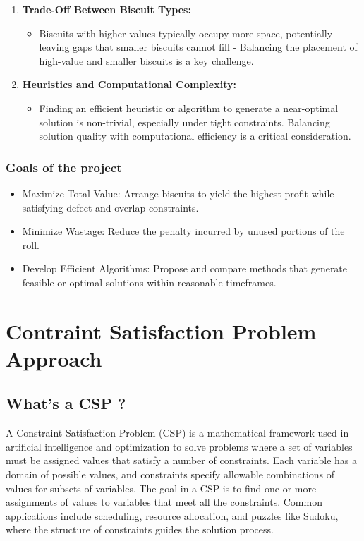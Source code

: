 \documentclass{modeleRapport}
\begin{document}
\begin{enumerate}
    \item \textbf{Trade-Off Between Biscuit Types:}
    \begin{itemize}
        \item Biscuits with higher values typically occupy more space, potentially leaving gaps that smaller biscuits 
        cannot fill - Balancing the placement of high-value and smaller biscuits is a key challenge.
    \end{itemize}

    \item \textbf{Heuristics and Computational Complexity:}
    \begin{itemize}
        \item Finding an efficient heuristic or algorithm to generate a near-optimal solution is non-trivial, 
        especially under tight constraints. Balancing solution quality with computational efficiency is a critical 
        consideration.
    \end{itemize}
\end{enumerate}

\subsubsection{Goals of the project}

\begin{itemize}
    \item Maximize Total Value: Arrange biscuits to yield the highest profit while satisfying defect and overlap constraints.
    \item Minimize Wastage: Reduce the penalty incurred by unused portions of the roll.
    \item Develop Efficient Algorithms: Propose and compare methods that generate feasible or optimal solutions 
    within reasonable timeframes.
\end{itemize}

\newpage

\section{Contraint Satisfaction Problem Approach}

\subsection{What's a CSP ?}

A Constraint Satisfaction Problem (CSP) is a mathematical framework used in artificial intelligence and 
optimization to solve problems where a set of variables must be assigned values that satisfy a number of constraints. 
Each variable has a domain of possible values, and constraints specify allowable combinations of values for subsets of 
variables. The goal in a CSP is to find one or more assignments of values to variables that meet all the constraints. 
Common applications include scheduling, resource allocation, and puzzles like Sudoku, where the structure of constraints 
guides the solution process.
\end{document}
